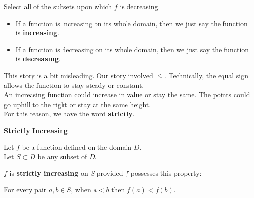 \documentclass{ximera}
\begin{document}
\begin{example}
\begin{question}

Select all of the subsets upon which $f$ is decreasing.


\begin{selectAll}
\choice [correct]{$[-2,6)$}
\choice [correct]{$[6,8]$}
\end{selectAll}
\end{question}





\end{example}




\begin{remark}
  \begin{itemize}
    \item If a function is increasing on its whole domain, then we just say the function is \textbf{increasing}.
    \item If a function is decreasing on its whole domain, then we just say the function is \textbf{decreasing}.
  \end{itemize}
\end{remark}




This story is a bit misleading.  Our story involved $\leq$.  Technically, the equal sign allows the function to stay steady or constant. \\

An increasing function could increase in value or stay the same.  The points could go uphill to the right or stay at the same height. \\

For this reason, we have the word \textbf{strictly}.








\begin{definition} \textbf{\textcolor{green!50!black}{Strictly Increasing}} 


Let $f$ be a function defined on the domain $D$. \\
Let $S \subset D$ be any subset of $D$.

$f$ is \textbf{strictly increasing} on $S$ provided $f$ possesses this property:  


\begin{center}
For every pair $a, b \in S$, when $a < b$ then $f(a) < f(b)$.
\end{center}

\end{definition}
\end{document}
